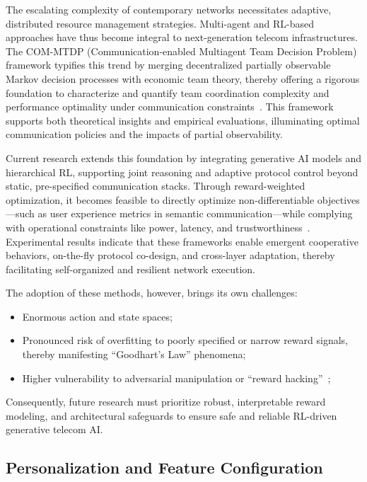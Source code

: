 The escalating complexity of contemporary networks necessitates adaptive, distributed resource management strategies. Multi-agent and RL-based approaches have thus become integral to next-generation telecom infrastructures. The COM-MTDP (Communication-enabled Multiagent Team Decision Problem) framework typifies this trend by merging decentralized partially observable Markov decision processes with economic team theory, thereby offering a rigorous foundation to characterize and quantify team coordination complexity and performance optimality under communication constraints~\cite{ref32}. This framework supports both theoretical insights and empirical evaluations, illuminating optimal communication policies and the impacts of partial observability.

Current research extends this foundation by integrating generative AI models and hierarchical RL, supporting joint reasoning and adaptive protocol control beyond static, pre-specified communication stacks. Through reward-weighted optimization, it becomes feasible to directly optimize non-differentiable objectives---such as user experience metrics in semantic communication---while complying with operational constraints like power, latency, and trustworthiness~\cite{ref1,ref26,ref36}. Experimental results indicate that these frameworks enable emergent cooperative behaviors, on-the-fly protocol co-design, and cross-layer adaptation, thereby facilitating self-organized and resilient network execution.

The adoption of these methods, however, brings its own challenges:

\begin{itemize}
    \item Enormous action and state spaces;
    \item Pronounced risk of overfitting to poorly specified or narrow reward signals, thereby manifesting ``Goodhart’s Law'' phenomena;
    \item Higher vulnerability to adversarial manipulation or ``reward hacking''~\cite{ref1};
\end{itemize}

Consequently, future research must prioritize robust, interpretable reward modeling, and architectural safeguards to ensure safe and reliable RL-driven generative telecom AI.

\subsection{Personalization and Feature Configuration}

